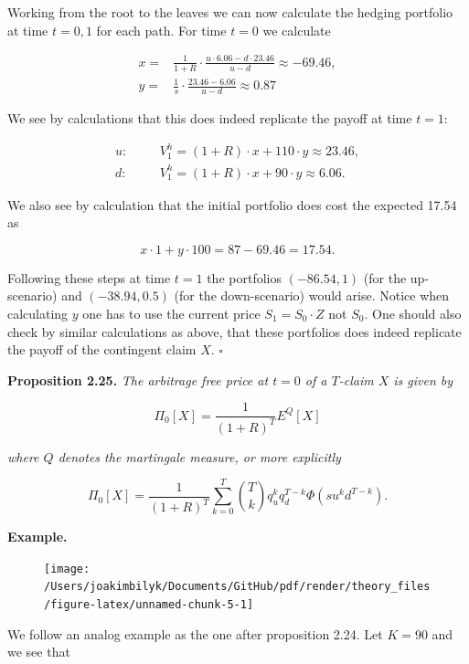 \documentclass[
]{article}
\begin{document}
Working from the root to the leaves we can now calculate the hedging
portfolio at time \(t=0,1\) for each path. For time \(t=0\) we calculate

\begin{align*}
x=&\frac{1}{1+R}\cdot \frac{u\cdot 6.06-d\cdot 23.46}{u-d}\approx -69.46,\\
y=&\frac{1}{s}\cdot\frac{23.46-6.06}{u-d}\approx0.87
\end{align*}

We see by calculations that this does indeed replicate the payoff at
time \(t=1\):

\begin{align*}
u:\hspace{20pt}&V_1^h=(1+R)\cdot x + 110\cdot y\approx 23.46,\\
d:\hspace{20pt}&V_1^h=(1+R)\cdot x + 90\cdot y\approx 6.06.
\end{align*}

We also see by calculation that the initial portfolio does cost the
expected 17.54 as

\[
x\cdot 1+y\cdot100=87-69.46=17.54.
\]

Following these steps at time \(t=1\) the portfolios \((-86.54,1)\) (for
the up-scenario) and \((-38.94,0.5)\) (for the down-scenario) would
arise. Notice when calculating \(y\) one has to use the current price
\(S_1=S_0\cdot Z\) not \(S_0\). One should also check by similar
calculations as above, that these portfolios does indeed replicate the
payoff of the contingent claim \(X\). \(\square\)

\textbf{Proposition 2.25.} \emph{The arbitrage free price at \(t=0\) of
a \(T\)-claim \(X\) is given by}

\[
\Pi_0[X]=\frac{1}{(1+R)^T}E^Q[X]
\]

\emph{where \(Q\) denotes the martingale measure, or more explicitly}

\[
\Pi_0[X]=\frac{1}{(1+R)^T}\sum_{k=0}^T\binom{T}{k}q_u^kq_d^{T-k}\Phi(su^kd^{T-k}).
\]

\textbf{Example.}

\begin{figure}\texttt{[image: /Users/joakimbilyk/Documents/GitHub/pdf/render/theory\_files/figure-latex/unnamed-chunk-5-1]}\end{figure}

We follow an analog example as the one after proposition 2.24. Let
\(K=90\) and we see that
\end{document}
